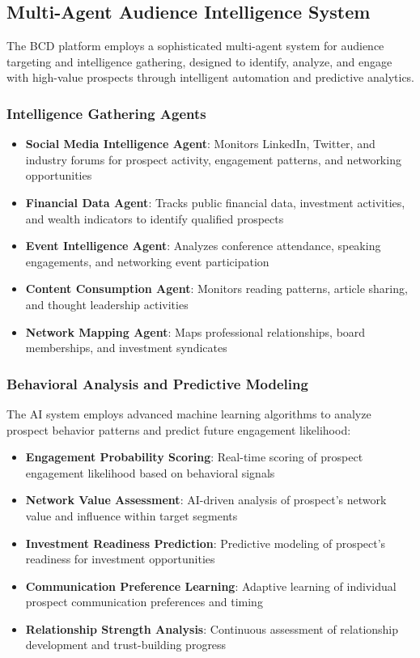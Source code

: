 \subsection{Multi-Agent Audience Intelligence System}

The BCD platform employs a sophisticated multi-agent system for audience targeting and intelligence gathering, designed to identify, analyze, and engage with high-value prospects through intelligent automation and predictive analytics.

\subsubsection{Intelligence Gathering Agents}

\begin{itemize}
    \item \textbf{Social Media Intelligence Agent}: Monitors LinkedIn, Twitter, and industry forums for prospect activity, engagement patterns, and networking opportunities
    \item \textbf{Financial Data Agent}: Tracks public financial data, investment activities, and wealth indicators to identify qualified prospects
    \item \textbf{Event Intelligence Agent}: Analyzes conference attendance, speaking engagements, and networking event participation
    \item \textbf{Content Consumption Agent}: Monitors reading patterns, article sharing, and thought leadership activities
    \item \textbf{Network Mapping Agent}: Maps professional relationships, board memberships, and investment syndicates
\end{itemize}

\subsubsection{Behavioral Analysis and Predictive Modeling}

The AI system employs advanced machine learning algorithms to analyze prospect behavior patterns and predict future engagement likelihood:

\begin{itemize}
    \item \textbf{Engagement Probability Scoring}: Real-time scoring of prospect engagement likelihood based on behavioral signals
    \item \textbf{Network Value Assessment}: AI-driven analysis of prospect's network value and influence within target segments
    \item \textbf{Investment Readiness Prediction}: Predictive modeling of prospect's readiness for investment opportunities
    \item \textbf{Communication Preference Learning}: Adaptive learning of individual prospect communication preferences and timing
    \item \textbf{Relationship Strength Analysis}: Continuous assessment of relationship development and trust-building progress
\end{itemize}

